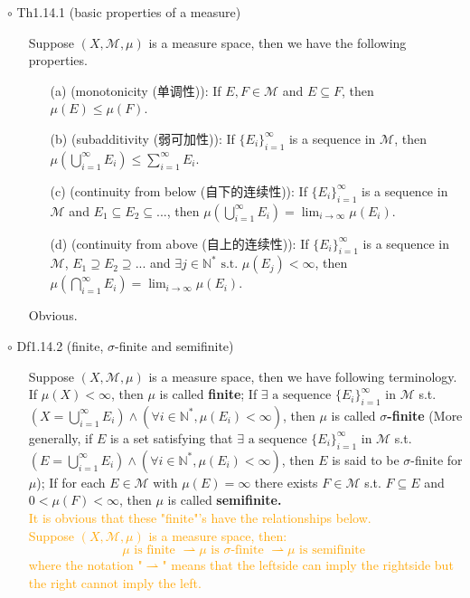 \documentclass{article}
\begin{document}
{\Large $\circ $ Th1.14.1 (basic properties of a measure)}\par
\begin{itemize}
    \item[]
    {\large Suppose $(X, \mathcal{M}, \mu)$ is a measure space, then we have the following properties.
    \begin{enumerate}
        \item[(a)] (monotonicity (单调性)): If $E, F\in\mathcal{M}$ and $E\subseteq F$, then $\mu(E)\leqslant\mu(F)$.
        \item[(b)] (subadditivity (弱可加性)): If $\{E_i\}_{i=1}^\infty$ is a sequence in $\mathcal{M}$, then
                    $\mu(\bigcup_{i=1}^\infty E_i)\leqslant \sum_{i=1}^{\infty} E_i$.
        \item[(c)] (continuity from below (自下的连续性)): If $\{E_i\}_{i=1}^\infty$ is a sequence in $\mathcal{M}$
                    and $E_1\subseteq E_2\subseteq...$, then $\mu(\bigcup_{i=1}^\infty E_i) = \lim_{i\to\infty} \mu(E_i)$.
        \item[(d)] (continuity from above (自上的连续性)): If $\{E_i\}_{i=1}^\infty$ is a sequence in $\mathcal{M}$,
                    $E_1\supseteq E_2\supseteq...$ and $\exists j\in \mathbb{N}^\ast \text{ s.t. }
                    \mu(E_j)<\infty$, then $\mu(\bigcap_{i=1}^\infty E_i) = \lim_{i\to\infty} \mu(E_i)$.  
    \end{enumerate}}
    {\textcolor{pf}{Obvious.}}
\end{itemize}\par
\quad

{\Large $\circ $ Df1.14.2 (finite, $\sigma$-finite and semifinite)}\par
\begin{itemize}
    \item[]
    {\large Suppose $(X, \mathcal{M}, \mu)$ is a measure space, then we have following terminology.\\
    If $\mu(X)<\infty$, then $\mu$ is called \textbf{finite}; If $\exists \text{ a sequence } \{E_i\}_{i=1}^\infty$
    in $\mathcal{M}$ s.t. $(X=\bigcup_{i=1}^\infty E_i)\land (\forall i\in\mathbb{N}^\ast,\mu(E_i)<\infty)$, then
    $\mu$ is called \textbf{$\sigma$-finite} (More generally, if $E$ is a set satisfying that 
    $\exists \text{ a sequence } \{E_i\}_{i=1}^\infty$ in $\mathcal{M}$ s.t. 
    $(E=\bigcup_{i=1}^\infty E_i)\land (\forall i\in\mathbb{N}^\ast,\mu(E_i)<\infty)$, then $E$ is said
    to be $\sigma$-finite for $\mu$); If for each $E\in\mathcal{M}$ with $\mu(E)=\infty$ 
    there exists $F\in\mathcal{M}$ s.t. $F\subseteq E$ and $0<\mu(F)<\infty$, 
    then $\mu$ is called \textbf{semifinite.}}\\
    {\textcolor{orange}{It is obvious that these "finite"'s have the relationships below.\\
    Suppose $(X, \mathcal{M}, \mu)$ is a measure space, then:
    $$\mu\text{ is finite }\rightharpoonup \mu\text{ is }\sigma\text{-finite }\rightharpoonup \mu\text{ is semifinite }$$
    where the notation "$\rightharpoonup$" means that the leftside 
    can imply the rightside but the right cannot imply the left.}}
\end{itemize}\par
\quad
\end{document}
